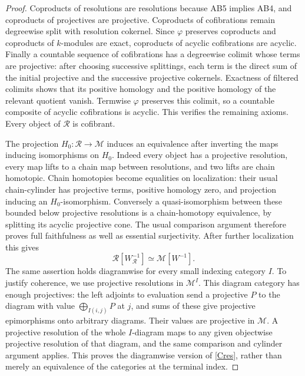 \begin{proof}
Coproducts of resolutions are resolutions because AB5 implies AB4, and coproducts of projectives are projective. Coproducts of cofibrations remain degreewise split with resolution cokernel. Since $\varphi$ preserves coproducts and coproducts of $k$-modules are exact, coproducts of acyclic cofibrations are acyclic. Finally a countable sequence of cofibrations has a degreewise colimit whose terms are projective: after choosing successive splittings, each term is the direct sum of the initial projective and the successive projective cokernels. Exactness of filtered colimits shows that its positive homology and the positive homology of the relevant quotient vanish. Termwise $\varphi$ preserves this colimit, so a countable composite of acyclic cofibrations is acyclic. This verifies the remaining axioms. Every object of $\mathcal R$ is cofibrant.

The projection $H_0:\mathcal R\to\mathcal M$ induces an equivalence after inverting the maps inducing isomorphisms on $H_0$. Indeed every object has a projective resolution, every map lifts to a chain map between resolutions, and two lifts are chain homotopic. Chain homotopies become equalities on localization: their usual chain-cylinder has projective terms, positive homology zero, and projection inducing an $H_0$-isomorphism. Conversely a quasi-isomorphism between these bounded below projective resolutions is a chain-homotopy equivalence, by splitting its acyclic projective cone. The usual comparison argument therefore proves full faithfulness as well as essential surjectivity. After further localization this gives
\[
 \mathcal R[W_{\mathcal R}^{-1}]\simeq\mathcal M[W^{-1}]. \tag{C-res}\label{Cres}
\]
The same assertion holds diagramwise for every small indexing category $I$. To justify coherence, we use projective resolutions in $\mathcal M^I$. This diagram category has enough projectives: the left adjoints to evaluation send a projective $P$ to the diagram with value $\bigoplus_{I(i,j)}P$ at $j$, and sums of these give projective epimorphisms onto arbitrary diagrams. Their values are projective in $\mathcal M$. A projective resolution of the whole $I$-diagram maps to any given objectwise projective resolution of that diagram, and the same comparison and cylinder argument applies. This proves the diagramwise version of \eqref{Cres}, rather than merely an equivalence of the categories at the terminal index.


\end{proof}
